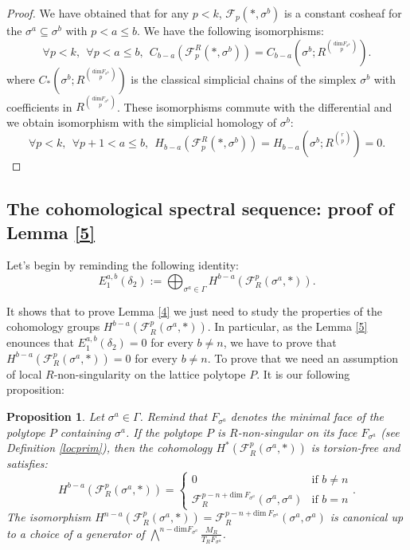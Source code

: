 \documentclass{article}
\newtheorem{proposition}{Proposition}
\begin{document}
\begin{proof}
    We have obtained that for any $p<k$, $\mathcal{F}_p(*,\sigma^b)$ is a constant cosheaf for the $\sigma^a \subseteq \sigma^b$ with $p < a\leq b$. We have the following isomorphisms:
    \begin{equation*}
        \forall p<k,~~\forall p<a\leq b, ~~C_{b-a}(\mathcal{F}_p^R(*,\sigma^b)) = C_{b-a}(\sigma^b;R^{\binom{\mathrm{dim}F_{\sigma^b}}{p}}).
    \end{equation*}
    where $C_{*}(\sigma^b;R^{\binom{\mathrm{dim}F_{\sigma^b}}{p}})$ is the classical simplicial chains of the simplex $\sigma^b$ with coefficients in $R^{\binom{\mathrm{dim}F_{\sigma^b}}{p}}$. These isomorphisms commute with the differential and we obtain isomorphism with the simplicial homology of $\sigma^b$:
    \begin{equation*}
     \forall p<k,~~\forall p+1<a\leq b,~~H_{b-a}(\mathcal{F}_p^R(*,\sigma^b)) = H_{b-a}(\sigma^b;R^{\binom{r}{p}})=0.
    \end{equation*}
\end{proof}

\subsection{The cohomological spectral sequence: proof of Lemma \ref{5}}

Let's begin by reminding the following identity:
\begin{equation*}
    E_1^{a,b}(\delta_{2}):= \bigoplus_{\sigma^a \in \Gamma} H^{b-a}(\mathcal{F}^p_R(\sigma^a,*)).
\end{equation*}

It shows that to prove Lemma \ref{4} we just need to study the properties of the cohomology groups $H^{b-a}(\mathcal{F}^p_R(\sigma^a,*))$. In particular, as the Lemma \ref{5} enounces that $E_1^{a,b}(\delta_{2})=0$ for every $b\neq n$, we have to prove that  $H^{b-a}(\mathcal{F}^p_R(\sigma^a,*)) = 0$ for every $b\neq n$. To prove that we need an assumption of local $R$-non-singularity on the lattice polytope $P$. It is our following proposition:

\begin{proposition}
    Let $\sigma^a \in \Gamma$. Remind that $F_{\sigma^a}$ denotes the minimal face of the polytope $P$ containing $\sigma^a$. If the polytope $P$ is $R$-non-singular on its face $F_{\sigma^a}$ (see Definition \ref{locprim}), then the cohomology $H^{*}(\mathcal{F}^p_R(\sigma^a,*))$ is torsion-free and satisfies:
    \begin{equation*}
        H^{b-a}(\mathcal{F}_R^p(\sigma^a,*)) = \left \{ \begin{array}{ll}
            0 & \text{if } b\neq n \\
            \mathcal{F}_R^{p - n + \mathrm{dim} ~ F_{\sigma^a}}(\sigma^a,\sigma^a) & \text{if } b=n
        \end{array} \right . .
    \end{equation*}
    The isomorphism $H^{n-a}(\mathcal{F}_R^p(\sigma^a,*)) = \mathcal{F}_R^{p - n + \mathrm{dim} ~ F_{\sigma^a}}(\sigma^a,\sigma^a)$ is canonical up to a choice of a generator of $\bigwedge^{n-\mathrm{dim}F_{\sigma^a}}\frac{M_R}{T_RF_{\sigma^a}}$.
    \label{theocohom}
\end{proposition}
\end{document}
